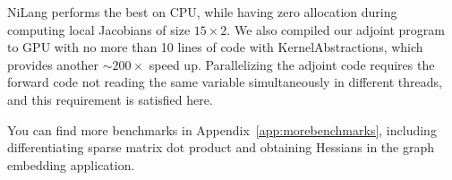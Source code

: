 \documentclass{article}
\newcommand{\<}{\langle}
\renewcommand{\>}{\rangle}
\newcommand{\App}[1]{Appendix~\ref{#1}}
\newcommand{\ra}[1]{\renewcommand{\arraystretch}{#1}}
\theoremstyle{definition}\newtheorem{definition}{\textit{Definition}}
\begin{document}
\begin{table}[h!]\centering
    \scriptsize
\begin{minipage}{\columnwidth}
\ra{1.3}
    \caption{Absolute runtimes in seconds for computing the objective (O) and Jacobians (J) in bundle adjustment.}\label{tbl:ba}
\end{minipage}
\end{table}

NiLang performs the best on CPU, while having zero allocation during computing local Jacobians of size $15 \times 2$.
We also compiled our adjoint program to GPU with no more than 10 lines of code with KernelAbstractions, which provides another $\sim 200\times$ speed up.
Parallelizing the adjoint code requires the forward code not reading the same variable simultaneously in different threads, and this requirement is satisfied here.

You can find more benchmarks in \App{app:morebenchmarks}, including differentiating sparse matrix dot product and obtaining Hessians in the graph embedding application.
\end{document}
